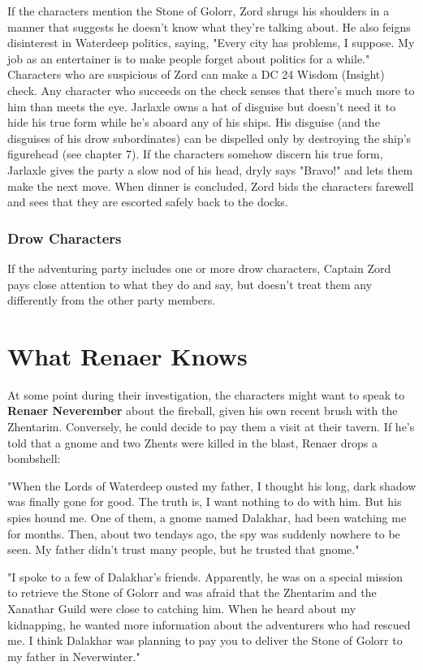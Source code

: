 \documentclass[10pt,a4paper,twoside,twocolumn,openany,nodeprecatedcode]{dndbook}
\begin{document}
If the characters mention the Stone of Golorr, Zord shrugs his shoulders in a manner that suggests he doesn't know what they're talking about. He also feigns disinterest in Waterdeep politics, saying, "Every city has problems, I suppose. My job as an entertainer is to make people forget about politics for a while." Characters who are suspicious of Zord can make a DC 24 Wisdom (Insight) check. Any character who succeeds on the check senses that there's much more to him than meets the eye.
Jarlaxle owns a hat of disguise but doesn't need it to hide his true form while he's aboard any of his ships. His disguise (and the disguises of his drow subordinates) can be dispelled only by destroying the ship's figurehead (see chapter 7). If the characters somehow discern his true form, Jarlaxle gives the party a slow nod of his head, dryly says "Bravo!" and lets them make the next move.
When dinner is concluded, Zord bids the characters farewell and sees that they are escorted safely back to the docks.
\subsubsection{Drow Characters}
If the adventuring party includes one or more drow characters, Captain Zord pays close attention to what they do and say, but doesn't treat them any differently from the other party members.
\section{What Renaer Knows}
At some point during their investigation, the characters might want to speak to \textbf{Renaer Neverember} about the fireball, given his own recent brush with the Zhentarim. Conversely, he could decide to pay them a visit at their tavern. If he's told that a gnome and two Zhents were killed in the blast, Renaer drops a bombshell:
\begin{DndReadAloud}{}
"When the Lords of Waterdeep ousted my father, I thought his long, dark shadow was finally gone for good. The truth is, I want nothing to do with him. But his spies hound me. One of them, a gnome named Dalakhar, had been watching me for months. Then, about two tendays ago, the spy was suddenly nowhere to be seen. My father didn't trust many people, but he trusted that gnome."

"I spoke to a few of Dalakhar's friends. Apparently, he was on a special mission to retrieve the Stone of Golorr and was afraid that the Zhentarim and the Xanathar Guild were close to catching him. When he heard about my kidnapping, he wanted more information about the adventurers who had rescued me. I think Dalakhar was planning to pay you to deliver the Stone of Golorr to my father in Neverwinter."
\end{DndReadAloud}
\end{document}
